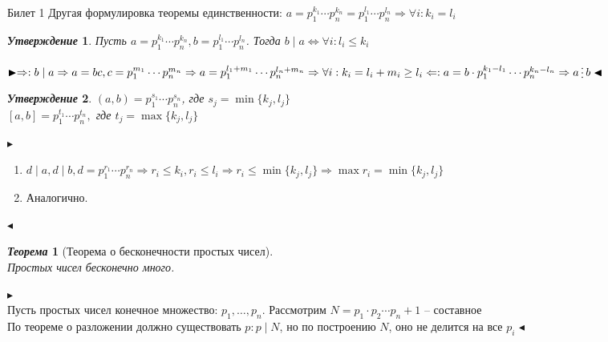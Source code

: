 \documentclass[a4paper,12pt]{article}
\newcommand{\divisible}{\mathop{\raisebox{-2pt}{\vdots}}}
\newtheorem{teo}{\textit{Теорема}}
\newtheorem{utv}{\textit{Утверждение}}
\newcommand{\q}{\quad}
\newcommand{\pb}{\blacktriangleright}
\newcommand{\pe}{\blacktriangleleft}
\newcommand{\Ra}{\Rightarrow}
\begin{document}
\newpage
\begin{mybox}{{Билет 1}}
Другая формулировка теоремы единственности: $a = p_1^{k_1}\cdots p_n^{k_n} = p_1^{l_1}\cdots p_n^{l_n}\Ra \forall i: k_i = l_i$\\
\begin{formbox}{}
\begin{utv} Пусть $a = p_1^{k_1}\cdots p_n^{k_n}, b = p_1^{l_1}\cdots p_n^{l_n}$. Тогда $b\mid a\iff \forall i: l_i \le k_i$
\end{utv}
\end{formbox}
$\pb  \Ra: b\mid a\Ra a = bc, c = p_1^{m_1}\cdots p_n^{m_n}\Ra a = p_1^{l_1 + m_1}\cdots p_n^{l_n + m_n}\Ra \forall i: k_i = l_i + m_i \ge l_i\\\q\\ \Leftarrow: a = b\cdot p_1^{k_1-l_1}\cdots p_n^{k_n - l_n}\Ra a\divisible b \pe$


\begin{formbox}{}
\begin{utv} $(a,b) = p_1^{s_1}\cdots p_n^{s_n}$, где $s_j = \min\{k_j, l_j\}$\\
$[a,b] = p_1^{t_1}\cdots p_n^{t_n},$ где $t_j = \max\{k_j, l_j\}$
\end{utv}
\end{formbox}
$\pb  $
\begin{enumerate}
\item $d\mid a, d\mid b, d = p_1^{r_1}\cdots p_n^{r_n}\Ra r_i\le k_i, r_i \le l_i\Ra r_i \le \min\{k_j, l_j\} \Ra \max r_i = \min\{k_j, l_j\}$
\item Аналогично.
\end{enumerate}
$\pe$


\begin{formbox}{}
\begin{teo}[Теорема о бесконечности простых чисел]\q\\
Простых чисел бесконечно много.
\end{teo}
\end{formbox}
$\pb     $\\
Пусть простых чисел конечное множество: $p_1,\dots,p_n$. Рассмотрим $N = p_1\cdot p_2\cdots p_n + 1$ -- составное\\
По теореме о разложении должно существовать $p: p\mid N$, но по построению $N$, оно не делится на все $p_i$
$\pe$
\end{mybox}
\end{document}
